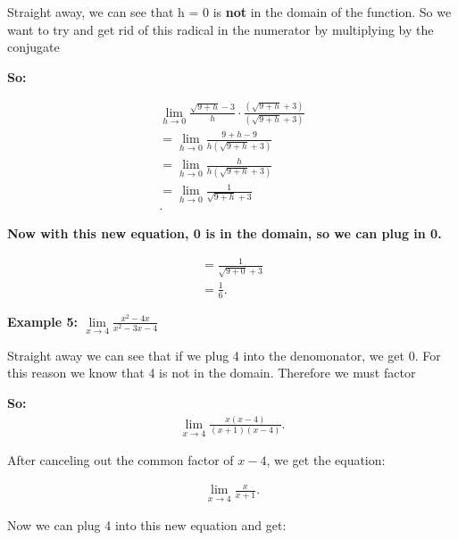 \documentclass{report}
\begin{document}
    \bigbreak \noindent \bigbreak \noindent  
    Straight away, we can see that h = 0 is \textbf{not} in the domain of the function. 
    So we want to try and get rid of this radical in the numerator by multiplying by the
    conjugate
    
    \bigbreak \noindent 
    \textbf{So:}

    \begin{align*}
        \lim\limits_{h \to 0}{ \frac{\sqrt{9+h} - 3}{h}} \cdot \frac{ \left(\sqrt{9+h} +3\right)}{ \left(\sqrt{9+h} +3\right)} \\       
        = \lim\limits_{h \to 0}{ \frac{9+h-9}{h \left(\sqrt{9+h}+3\right)}} \\ 
        = \lim\limits_{h \to 0}{ \frac{h}{h \left(\sqrt{9+h}+3\right)}} \\
        = \lim\limits_{h \to 0}{ \frac{1}{\sqrt{9+h}+3}} \\
    .\end{align*}

    \noindent \textbf{Now with this new equation, 0 is in the domain, so we can plug in 0.}

    \begin{align*}
        = \frac{1}{\sqrt{9+0}+3} \\
        = \frac{1}{6}
    .\end{align*}

    \bigbreak \noindent \bigbreak \noindent 
    \begin{large}
       \textbf{Example 5: $\lim\limits_{x \to 4}{ \frac{x^2-4x}{x^2-3x-4}}$} 
    \end{large}
   
    \bigbreak \noindent 
    Straight away we can see that if we plug 4 into the denomonator, we get 0. For this reason
    we know that 4 is not in the domain. Therefore we must factor
    
    \bigbreak \noindent 
    \textbf{So:}
    \begin{align*}
       \lim\limits_{x \to 4}{ \frac{x \left(x-4\right)}{ \left(x+1\right) \left(x-4\right)}} 
    .\end{align*}

    \bigbreak \noindent 
    After canceling out the common factor of $x-4$, we get the equation:

    \begin{align*}
        \lim\limits_{x \to 4}{ \frac{x}{x+1}}
    .\end{align*}

    \bigbreak \noindent 
    Now we can plug 4 into this new equation and get:
\end{document}
